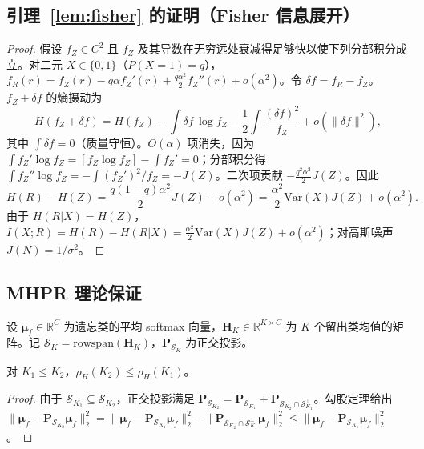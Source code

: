\subsection{引理~\ref{lem:fisher} 的证明（Fisher 信息展开）}
\label{app:fisher}
\begin{proof}
假设 $f_Z\in C^2$ 且 $f_Z$ 及其导数在无穷远处衰减得足够快以使下列分部积分成立。对二元 $X\in\{0,1\}$（$P(X{=}1)=q$），$f_R(r)=f_Z(r)-q\alpha f_Z'(r)+\frac{q\alpha^2}{2}f_Z''(r)+o(\alpha^2)$。令 $\delta f=f_R-f_Z$。$f_Z+\delta f$ 的熵摄动为
\begin{equation}
H(f_Z+\delta f)=H(f_Z)-\int\delta f\,\log f_Z-\frac12\int\frac{(\delta f)^2}{f_Z}+o(\|\delta f\|^2),
\end{equation}
其中 $\int\delta f=0$（质量守恒）。$O(\alpha)$ 项消失，因为 $\int f_Z'\log f_Z=[f_Z\log f_Z]-\int f_Z'=0$；分部积分得 $\int f_Z''\log f_Z=-\int(f_Z')^2/f_Z=-J(Z)$。二次项贡献 $-\frac{q^2\alpha^2}{2}J(Z)$。因此
\begin{equation}
H(R)-H(Z)=\frac{q(1-q)\alpha^2}{2}J(Z)+o(\alpha^2)=\frac{\alpha^2}{2}\mathrm{Var}(X)J(Z)+o(\alpha^2).
\end{equation}
由于 $H(R|X)=H(Z)$，$I(X;R)=H(R)-H(R|X)=\frac{\alpha^2}{2}\mathrm{Var}(X)J(Z)+o(\alpha^2)$；对高斯噪声 $J(N)=1/\sigma^2$。
\end{proof}

\subsection{MHPR 理论保证}
\label{app:mhpr}

设 $\boldsymbol{\mu}_f \in \mathbb{R}^C$ 为遗忘类的平均 softmax 向量，$\mathbf{H}_K \in \mathbb{R}^{K\times C}$ 为 $K$ 个留出类均值的矩阵。记 $\mathcal{S}_K = \mathrm{rowspan}(\mathbf{H}_K)$，$\mathbf{P}_{\mathcal{S}_K}$ 为正交投影。

\begin{proposition}[随 $K$ 的单调改进]
\label{prop:mhpr_monotone}
对 $K_1 \le K_2$，$\rho_H(K_2) \le \rho_H(K_1)$。
\end{proposition}
\begin{proof}
由于 $\mathcal{S}_{K_1} \subseteq \mathcal{S}_{K_2}$，正交投影满足 $\mathbf{P}_{\mathcal{S}_{K_2}} = \mathbf{P}_{\mathcal{S}_{K_1}} + \mathbf{P}_{\mathcal{S}_{K_2} \cap \mathcal{S}_{K_1}^\perp}$。勾股定理给出 $\|\boldsymbol{\mu}_f - \mathbf{P}_{\mathcal{S}_{K_2}}\boldsymbol{\mu}_f\|_2^2 = \|\boldsymbol{\mu}_f - \mathbf{P}_{\mathcal{S}_{K_1}}\boldsymbol{\mu}_f\|_2^2 - \|\mathbf{P}_{\mathcal{S}_{K_2} \cap \mathcal{S}_{K_1}^\perp}\boldsymbol{\mu}_f\|_2^2 \le \|\boldsymbol{\mu}_f - \mathbf{P}_{\mathcal{S}_{K_1}}\boldsymbol{\mu}_f\|_2^2$。
\end{proof}

